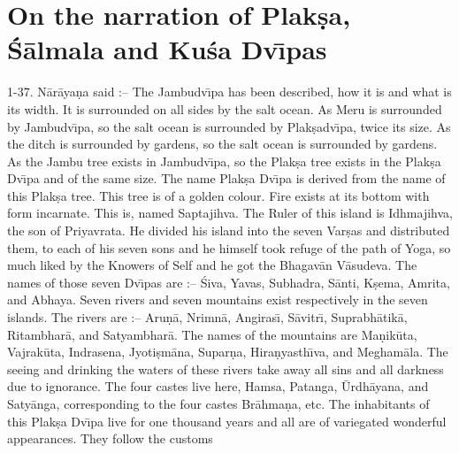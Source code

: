 \chapter{On the narration of Plak\d{s}a, \'S\=almala and Ku\'sa Dv\={\i}pas}

1-37. N\=ar\=aya\d{n}a said :-- The Jambudv\={\i}pa has been described, how it is and what is its width. It is surrounded on all sides by the salt ocean. As Meru is surrounded by Jambudv\={\i}pa, so the salt ocean is surrounded by Plak\d{s}adv\={\i}pa, twice its size. As the ditch is surrounded by gardens, so the salt ocean is surrounded by gardens. As the Jambu tree exists in Jambudv\={\i}pa, so the Plak\d{s}a tree exists in the Plak\d{s}a Dv\={\i}pa and of the same size. The name Plak\d{s}a Dv\={\i}pa is derived from the name of this Plak\d{s}a tree. This tree is of a golden colour. Fire exists at its bottom with form incarnate. This is, named Saptajihva. The Ruler of this island is Idhmajihva, the son of Priyavrata. He divided his island into the seven Var\d{s}as and distributed them, to each of his seven sons and he himself took refuge of the path of Yoga, so much liked by the Knowers of Self and he got the Bhagav\=an V\=asudeva. The names of those seven Dv\={\i}pas are :-- \'Siva, Yavas, Subhadra, S\=anti, K\d{s}ema, Amrita, and Abhaya. Seven rivers and seven mountains exist respectively in the seven islands. The rivers are :-- Aru\d{n}\=a, Nrimn\=a, Angiras\={\i}, S\=avitr\={\i}, Suprabh\=atik\=a, Ritambhar\=a, and Satyambhar\=a. The names of the mountains are Ma\d{n}ik\=uta, Vajrak\=uta, Indrasena, Jyoti\d{s}m\=ana, Supar\d{n}a, Hira\d{n}yasth\={\i}va, and Megham\=ala. The seeing and drinking the waters of these rivers take away all sins and all darkness due to ignorance. The four castes live here, Hamsa, Patanga, \=Urdh\=ayana, and Saty\=anga, corresponding to the four castes Br\=ahma\d{n}a, etc. The inhabitants of this Plak\d{s}a Dv\={\i}pa live for one thousand years and all are of variegated wonderful appearances. They follow the customs


